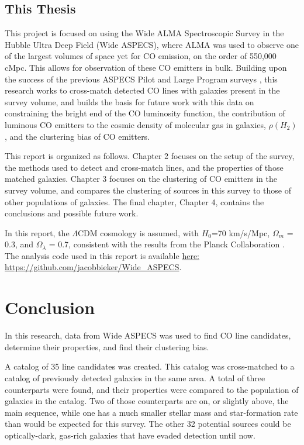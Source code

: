\documentclass[twoside,single]{lion-msc}
\begin{document}
\section{This Thesis}

This project is focused on using the Wide ALMA Spectroscopic Survey in the Hubble Ultra Deep Field (Wide ASPECS), where ALMA was used to observe one of the largest volumes of space yet for CO emission, on the order of 550,000 cMpc. This allows for observation of these CO emitters in bulk. Building upon the success of the previous ASPECS Pilot and Large Program surveys \cite{walter2016alma, decarli2019alma}, this research works to cross-match detected CO lines with galaxies present in the survey volume, and builds the basis for future work with this data on constraining the bright end of the CO luminosity function, the contribution of luminous CO emitters to the cosmic density of molecular gas in galaxies, $\rho(H_2)$, and the clustering bias of CO emitters.

This report is organized as follows. Chapter 2 focuses on the setup of the survey, the methods used to detect and cross-match lines, and the properties of those matched galaxies. Chapter 3 focuses on the clustering of CO emitters in the survey volume, and compares the clustering of sources in this survey to those of other populations of galaxies. The final chapter, Chapter 4, contains the conclusions and possible future work. 

In this report, the $\Lambda$CDM cosmology is assumed, with $H_0$=70 km/s/Mpc, $\Omega_m$ = 0.3, and $\Omega_{\lambda}$ = 0.7, consistent with the results from the Planck Collaboration \cite{ade2016planck}. The analysis code used in this report is available \href{https://github.com/jacobbieker/Wide\_ASPECS}{here: https://github.com/jacobbieker/Wide\_ASPECS}. 





\chapter{Conclusion}

In this research, data from Wide ASPECS was used to find CO line candidates, determine their properties, and find their clustering bias.

A catalog of 35 line candidates was created. This catalog was cross-matched to a catalog of previously detected galaxies in the same area. A total of three counterparts were found, and their properties were compared to the population of galaxies in the catalog. Two of those counterparts are on, or slightly above, the main sequence, while one has a much smaller stellar mass and star-formation rate than would be expected for this survey. The other 32 potential sources could be optically-dark, gas-rich galaxies that have evaded detection until now. 
\end{document}
